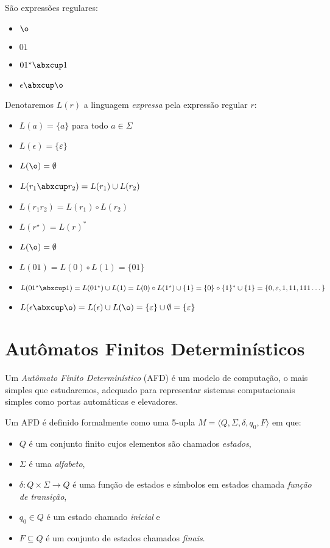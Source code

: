 \begin{example}
  São expressões regulares:
\begin{itemize}
\item[] $\o$
\item[] $01$
\item[] $01^\star\abxcup 1$
\item[] $\epsilon \abxcup \o$
\end{itemize}
\end{example}

Denotaremos $L(r)$ a linguagem {\em expressa} pela expressão regular $r$:
\begin{itemize}
\item[] $L(a) = \{a\}$ para todo $a \in \Sigma$
\item[] $L(\epsilon) = \{\varepsilon\}$
\item[] $L(\o) = \emptyset$
\item[] $L(r_1 \abxcup r_2) = L(r_1) \cup L(r_2)$
\item[] $L(r_1r_2) = L(r_1) \circ L(r_2)$
\item[] $L(r^\star) = L(r)^*$
\end{itemize}


\begin{example}
  \begin{itemize}
  \item[] $L(\o) = \emptyset$
  \item[] $L(01) = L(0) \circ L(1) = \{01\}$
  \item[] $L(01^\star\abxcup 1) = L(01^\star) \cup L(1) = L(0) \circ L(1^\star) \cup \{1\} = \{0\}\circ\{1\}^* \cup \{1\} = \{0, \varepsilon, 1, 11, 111 \dots\}$
  \item[] $L(\epsilon \abxcup \o) = L(\epsilon) \cup L(\o) = \{\varepsilon\} \cup \emptyset = \{\varepsilon\}$
\end{itemize}
\end{example}


\section{Autômatos Finitos Determinísticos}
\label{sec:afd}

Um {\em Autômato Finito Determinístico} (AFD) é um modelo de computação, o mais simples que estudaremos, adequado para representar sistemas computacionais simples como portas automáticas e elevadores.

Um AFD é definido formalmente como uma 5-upla $M = \langle Q, \Sigma, \delta, q_0, F \rangle$ em que:
\begin{itemize}
\item[] $Q$ é um conjunto finito cujos elementos são chamados {\em estados},
\item[] $\Sigma$ é uma {\em alfabeto},
\item[] $\delta: Q \times \Sigma \to Q$ é uma função de estados e símbolos em estados chamada {\em função de transição},
\item[] $q_0 \in Q$ é um estado chamado {\em inicial} e
\item[] $F \subseteq Q$ é um conjunto de estados chamados {\em finais}.
\end{itemize}

